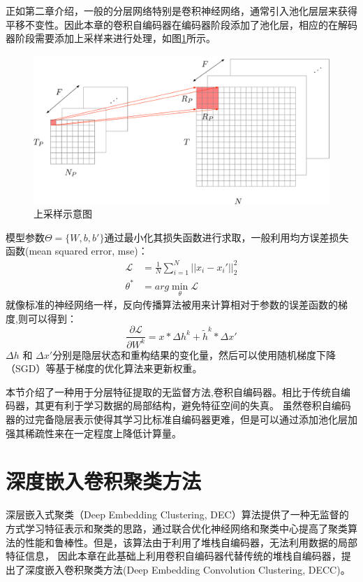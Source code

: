 正如第二章介绍，一般的分层网络特别是卷积神经网络，通常引入池化层层来获得平移不变性。因此本章的卷积自编码器在编码器阶段添加了池化层，相应的在解码器阶段需要添加上采样来进行处理，如图\ref{fig:unpool}所示。

\begin{figure}[hbt]
	\centering
	\includegraphics[width=13.5cm]{figures/AE/unpool}
	\caption{上采样示意图}
	\label{fig:unpool}
\end{figure}

模型参数$\Theta=\{{W},{b},{b'}\}$通过最小化其损失函数进行求取，一般利用均方误差损失函数(mean squared error, mse)：
\begin{align}
	\mathscr{L} &= \frac{1}{N}\sum_{i=1}^N||x_i-x_i'||_2^2 \label{equ:mse_loss}\\
	\theta^* &= arg\min\limits_{\theta} \mathscr{L}  \label{equ:mse}
\end{align}
就像标准的神经网络一样，反向传播算法被用来计算相对于参数的误差函数的梯度,则可以得到：
\begin{equation}
	\frac{\partial \mathscr{L}}{\partial W^k}=x * \Delta h ^k+\tilde{h}^k * \Delta x'
\end{equation}
$\Delta h$ 和 $\Delta x'$分别是隐层状态和重构结果的变化量，然后可以使用随机梯度下降（SGD）等基于梯度的优化算法来更新权重。

本节介绍了一种用于分层特征提取的无监督方法,卷积自编码器。相比于传统自编码器，其更有利于学习数据的局部结构，避免特征空间的失真。
虽然卷积自编码器的过完备隐层表示使得其学习比标准自编码器更难，但是可以通过添加池化层加强其稀疏性来在一定程度上降低计算量。

\section{深度嵌入卷积聚类方法}
深层嵌入式聚类（Deep Embedding Clustering, DEC）\cite{xie2016unsupervised}算法提供了一种无监督的方式学习特征表示和聚类的思路，通过联合优化神经网络和聚类中心提高了聚类算法的性能和鲁棒性。但是，该算法由于利用了堆栈自编码器，无法利用数据的局部特征信息，
因此本章在此基础上利用卷积自编码器代替传统的堆栈自编码器，提出了深度嵌入卷积聚类方法(Deep Embedding Convolution Clustering, DECC)。

